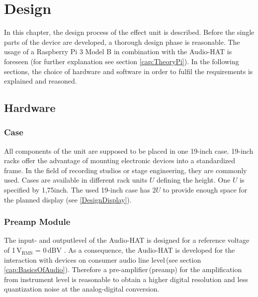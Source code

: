 \newpage
\chapter{Design}

In this chapter, the design process of the effect unit is described.
Before the single parts of the device are developed, a thorough design phase is reasonable.
The usage of a Raspberry Pi 3 Model B in combination with the Audio-HAT is foreseen (for further explanation see section \ref{cap:TheoryPi}).
In the following sections, the choice of hardware and software in order to fulfil the requirements is explained and reasoned.



\section{Hardware}

\subsection{Case}
All components of the unit are supposed to be placed in one 19-inch case.
19-inch racks offer the advantage of mounting electronic devices into a standardized frame.
In the field of recording studios or stage engineering, they are commonly used.
Cases are available in different rack units $U$ defining the height.
One $U$ is specified by 1,75inch.
The used 19-inch case has $2U$ to provide enough space for the planned display (see \ref{DesignDisplay}).



\subsection{Preamp Module} \label{DesignPreamp}

The input- and outputlevel of the Audio-HAT is designed for a reference voltage of 1\,V$_{\mathrm{RMS}}$ = 0\,dBV \cite[p.\,31]{Albers:2017}. As a consequence, the Audio-HAT is developed for the interaction with devices on consumer audio line level\,(see section \ref{cap:BasicsOfAudio}).
Therefore a pre-amplifier\,(preamp) for the amplification from instrument level is reasonable to obtain a higher
digital resolution and less quantization noise at the analog-digital conversion.

